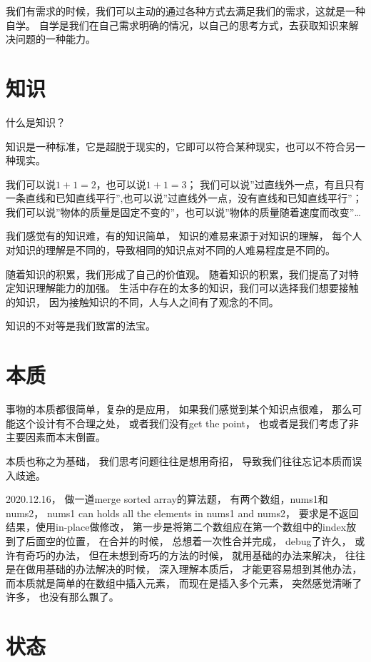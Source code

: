 我们有需求的时候，我们可以主动的通过各种方式去满足我们的需求，这就是一种自学。
自学是我们在自己需求明确的情况，以自己的思考方式，去获取知识来解决问题的一种能力。







\section{知识}
什么是知识？

知识是一种标准，它是超脱于现实的，它即可以符合某种现实，也可以不符合另一种现实。

我们可以说$1+1=2$，也可以说$1+1=3$；
我们可以说''过直线外一点，有且只有一条直线和已知直线平行'',也可以说''过直线外一点，没有直线和已知直线平行''；
我们可以说''物体的质量是固定不变的''，也可以说''物体的质量随着速度而改变''\dots



我们感觉有的知识难，有的知识简单，
知识的难易来源于对知识的理解，
每个人对知识的理解是不同的，导致相同的知识点对不同的人难易程度是不同的。

随着知识的积累，我们形成了自己的价值观。
随着知识的积累，我们提高了对特定知识理解能力的加强。
生活中存在的太多的知识，我们可以选择我们想要接触的知识，
因为接触知识的不同，人与人之间有了观念的不同。

知识的不对等是我们致富的法宝。


\section{本质}

事物的本质都很简单，复杂的是应用，
如果我们感觉到某个知识点很难，
那么可能这个设计有不合理之处，
或者我们没有get the point，
也或者是我们考虑了非主要因素而本末倒置。


本质也称之为基础，
我们思考问题往往是想用奇招，
导致我们往往忘记本质而误入歧途。


2020.12.16，
做一道merge sorted array的算法题，
有两个数组，nums1和nums2，
nums1 can holds all the elements in nums1 and nums2，
要求是不返回结果，使用in-place做修改，
第一步是将第二个数组应在第一个数组中的index放到了后面空的位置，
在合并的时候，
总想着一次性合并完成，
debug了许久，
或许有奇巧的办法，
但在未想到奇巧的方法的时候，
就用基础的办法来解决，
往往是在做用基础的办法解决的时候，
深入理解本质后，
才能更容易想到其他办法，
而本质就是简单的在数组中插入元素，
而现在是插入多个元素，
突然感觉清晰了许多，
也没有那么飘了。


\section{状态}

